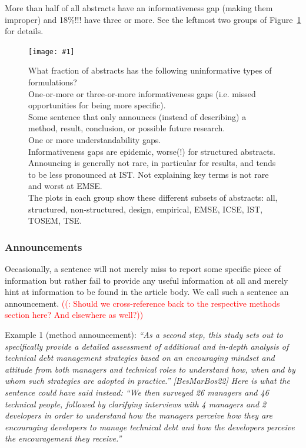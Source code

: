 \documentclass[10pt,journal,compsoc]{IEEEtran}
\newcommand{\Plotwide}[2]{%
	\begin{figure}[tbp]%
		\centering\texttt{[image: \#1]}%
		\vspace{-4mm}\caption{#2}\label{#1}%
    \end{figure}}
\newcommand{\Art}[1]{\bgroup[#1]\egroup} %
\newcounter{todonumber}
\newcommand{\Todo}[1]{\stepcounter{todonumber}\textcolor{red}{\sffamily ((\arabic{todonumber}: #1))}}
\newcommand{\Quote}[1]{\bgroup\itshape ``#1''\egroup}  %
\newcommand{\Pseudoquote}[1]{\bgroup\itshape ``#1''\egroup}  %
\newcommand{\Describegroups}{The plots in each group show these different subsets of abstracts:
	all, structured, non-structured, design, empirical, EMSE, ICSE, IST, TOSEM, TSE.}
\begin{document}
More than half of all abstracts have an informativeness gap (making them improper)
and 18\%!!! have three or more.
See the leftmost two groups of Figure~\ref{nonzerofractionbar_xletgroups_missinginfofractions}
for details.

\Plotwide{nonzerofractionbar_xletgroups_missinginfofractions}{%
	What fraction of abstracts has the following uninformative types of formulations?\\
	One-or-more or three-or-more informativeness gaps (i.e. missed opportunities for being more specific).\\
	Some sentence that only announces (instead of describing) a method, result, conclusion, or
	possible future research.\\
	One or more understandability gaps.\\
	Informativeness gaps are epidemic, worse(!) for structured abstracts.
	Announcing is generally not rare, in particular for results, and tends to be less pronounced
	at IST.
	Not explaining key terms is not rare and worst at EMSE.\\
	\Describegroups}

\subsubsection{Announcements}\label{announcements}

Occasionally, a sentence will not merely miss to report some specific piece of information
but rather fail to provide any useful information at all and merely hint at
information to be found in the article body.
We call such a sentence an announcement.
\Todo{Should we cross-reference back to the respective methods section here? And elsewhere as well?}

Example 1 (method announcement):
\Quote{As a second step, this study sets out to specifically
  provide a detailed assessment of additional and in-depth analysis of technical debt management strategies based
  on an encouraging mindset and attitude from both managers and technical roles to understand how, when and by
  whom such strategies are adopted in practice.} \Art{BesMarBos22}
Here is what the sentence could have said instead:
\Pseudoquote{We then surveyed 26 managers and 46 technical people, followed by clarifying interviews
  with 4 managers and 2 developers in order to understand how the managers perceive how they are encouraging
  developers to manage technical debt and how the developers perceive the encouragement they receive.}
\end{document}
